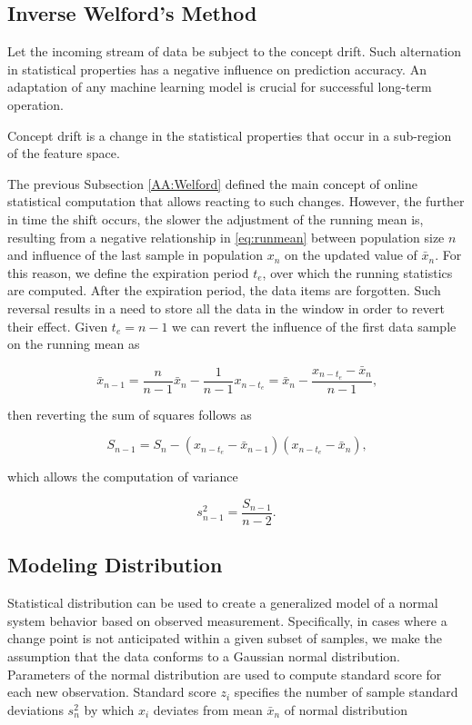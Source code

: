 \subsection{Inverse Welford's Method}\label{AA:InvWelford}
Let the incoming stream of data be subject to the concept drift. Such alternation in statistical properties has a negative influence on prediction accuracy. An adaptation of any machine learning model is crucial for successful long-term operation. 

\begin{definition}
Concept drift is a change in the statistical properties that occur in a sub-region of the feature space.
\end{definition}

The previous Subsection \ref{AA:Welford} defined the main concept of online statistical computation that allows reacting to such changes. However, the further in time the shift occurs, the slower the adjustment of the running mean is, resulting from a negative relationship in \eqref{eq:runmean} between population size \(n\) and influence of the last sample in population \(x_n\) on the updated value of \(\bar x_{n}\). For this reason, we define the expiration period \(t_e\), over which the running statistics are computed. After the expiration period, the data items are forgotten. Such reversal results in a need to store all the data in the window in order to revert their effect. Given \(t_e=n-1\) we can revert the influence of the first data sample on the running mean as

\begin{equation}
\bar x_{n-1} = \frac{n}{n-1} \bar x_{n} - \frac{1}{n-1}x_{n-t_e} = \bar x_{n} - \frac{x_{n-t_e} - \bar x_{n}}{n-1}\text{,}\label{eq:revmean}
\end{equation}

then reverting the sum of squares follows as

\begin{equation}
S_{n-1} = S_n - (x_{n-t_e} - \bar x_{n-1})(x_{n-t_e} - \bar x_n)\text{,}\label{eq:revrunmean}
\end{equation}

which allows the computation of variance 

\begin{equation}
s^2_{n-1} = \frac{S_{n-1}}{n-2}\text{.}\label{eq:revvar}
\end{equation}

\subsection{Modeling Distribution}\label{AA:Distribution}
Statistical distribution can be used to create a generalized model of a normal system behavior based on observed measurement. Specifically, in cases where a change point is not anticipated within a given subset of samples, we make the assumption that the data conforms to a Gaussian normal distribution. Parameters of the normal distribution are used to compute  standard score for each new observation. Standard score $z_i$ specifies the number of sample standard deviations \(s^2_n\) by which \(x_i\) deviates from mean \(\bar x_n\) of normal distribution

